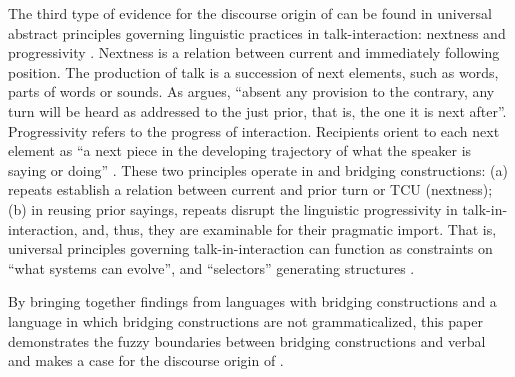 \documentclass[output=paper]{LSP/langsci}
\begin{document}
The third type of evidence for the discourse origin of  can be found in universal abstract principles governing linguistic practices in talk-interaction: nextness and progressivity \citep{schegloff06}. Nextness is a relation between current and immediately following position. The production of talk is a succession of next elements, such as words, parts of words or sounds. As \citet[][86]{schegloff06} argues, ``absent any provision to the contrary, any turn will be heard as addressed to the just prior, that is, the one it is next after''. Progressivity refers to the  progress of interaction. Recipients orient to each next element as ``a next piece in the developing trajectory of what the speaker is saying or doing'' \citep[][86]{schegloff06}. These two principles operate in  and bridging constructions: (a) repeats establish a relation between current and prior turn or TCU (nextness); (b) in reusing prior sayings, repeats disrupt the linguistic progressivity in talk-in-interaction, and, thus, they are examinable for their pragmatic import. That is, universal principles governing talk-in-interaction can function as constraints on ``what systems can evolve'', and ``selectors'' generating structures \citep[][446]{evans.2009}.  

By bringing together findings from languages with bridging constructions and a language in which bridging constructions are not grammaticalized, this paper demonstrates the fuzzy boundaries between bridging constructions and verbal  and makes a case for the discourse origin of . 
\end{document}
